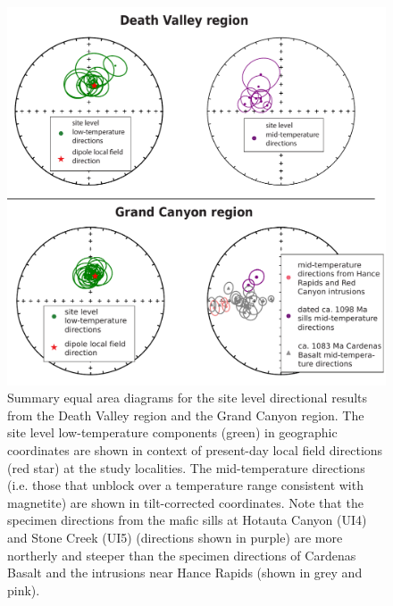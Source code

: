\documentclass[draft]{agujournal2019}
\begin{document}
\begin{figure}[h!]
\centering
\includegraphics[width=\textwidth]{equal_area_plots.pdf}
\caption{\footnotesize Summary equal area diagrams for the site level directional results from the Death Valley region and the Grand Canyon region. The site level low-temperature components (green) in geographic coordinates are shown in context of present-day local field directions (red star) at the study localities. The mid-temperature directions (i.e. those that unblock over a temperature range consistent with magnetite) are shown in tilt-corrected coordinates. Note that the specimen directions from the mafic sills at Hotauta Canyon (UI4) and Stone Creek (UI5) (directions shown in purple) are more northerly and steeper than the specimen directions of Cardenas Basalt and the intrusions near Hance Rapids (shown in grey and pink).}
\label{fig:equal_area_plots}
\end{figure}
\end{document}
